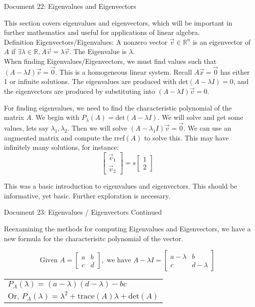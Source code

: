 \documentclass[11pt]{article}
\begin{document}
\newpage
\begin{center}
Document 22: Eigenvalues and Eigenvectors
\end{center}

\vspace{0.2cm}
This section covers eigenvalues and eigenvectors, which will be important in further mathematics and useful for applications of linear algebra.\\

\noindent
Definition Eigenvectors/Eigenvalues: A nonzero vector $\vec{v}\in\mathbb{R}^n$ is an eigenvector of $A$ if $\exists\lambda\in\mathbb{R}, A\vec{v}=\lambda\vec{v}$. The Eigenvalue is $\lambda$.\\

When finding Eigenvalues/Eigenvectors, we must find values such that $(A-\lambda I)\vec{v}=\vec{0}$. This is a homogeneous linear system. Recall $A\vec{x}=\vec{0}$ has either 1 or infinite solutions. The eigenvalues are produced with det$(A-\lambda I)=0$, and the eigenvectors are produced by substituting into $(A-\lambda I)\vec{v}=0$.

For finding eigenvalues, we need to find the characteristic polynomial of the matrix $A$. We begin with $P_\lambda (A)=\text{det}(A-\lambda I)$. We will solve and get some values, lets say $\lambda_1,\lambda_2$. Then we will solve $(A-\lambda_1 I)\vec{v}=\vec{0}$. We can use an augmented matrix and compute the rref$(A)$ to solve this. This may have infinitely many solutions, for instance: $$\begin{bmatrix}\vec{v}_1\\\vec{v}_2\end{bmatrix}=s\begin{bmatrix}1\\2\end{bmatrix}$$

This was a basic introduction to eigenvalues and eigenvectors. This should be informative, yet basic. Further exploration is necessary.

\newpage
\begin{center}
Document 23: Eigenvalues / Eigenvectors Continued
\end{center}

Reexamining the methods for computing Eigenvalues and Eigenvectors, we have a new formula for the characterisitc polynomial of the vector.

$$\text{Given }A=\begin{bmatrix}a & b\\c & d\end{bmatrix}, \text{ we have } A-\lambda I=\begin{bmatrix}a-\lambda & b\\c & d-\lambda\end{bmatrix}$$
\begin{center}\begin{tabular}{l}
$P_A(\lambda)=(a-\lambda)(d-\lambda)-bc$\\
$\text{Or, }P_A(\lambda)=\lambda ^2+\text{trace}(A)\lambda+\text{det}(A)$
\end{tabular}\end{center}
\end{document}
